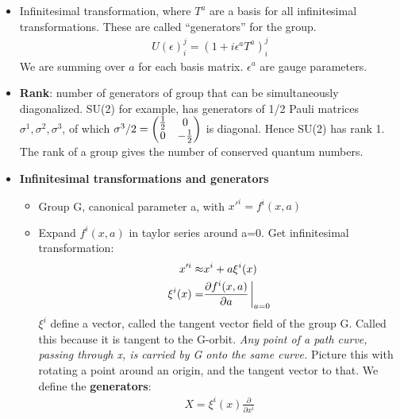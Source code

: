 \begin{itemize}
        \item Infinitesimal transformation, where $T^a$ are a basis for all infinitesimal transformations. These are called ``generators'' for the group. \cite{wells}
        \begin{equation}\begin{split}
        U(\epsilon)_i^j=(1+i\epsilon^aT^a)_i^j
        \end{split}\end{equation}
        We are summing over $a$ for each basis matrix. $\epsilon^a$ are gauge parameters.
    \item \textbf{Rank}: number of generators of group that can be simultaneously diagonalized. SU(2) for example, has generators of 1/2 Pauli matrices $\sigma^1,\sigma^2,\sigma^3$, of which $\sigma^3/2=\begin{pmatrix}\frac{1}{2}&0\\0&-\frac{1}{2}\end{pmatrix}$ is diagonal. Hence SU(2) has rank 1. The rank of a group gives the number of conserved quantum numbers.
    \item \textbf{Infinitesimal transformations and generators} \cite{ibragimov}
    \begin{itemize}
        \item Group G, canonical parameter a, with $x'^i=f^i(x,a)$ \cite{ibragimov}
        \item Expand $f^i(x,a)$ in taylor series around a=0. Get infinitesimal transformation: \cite{ibragimov}
        \begin{equation}\begin{split}
        x'^i\approx&x^i+a\xi^i(x) \\
        \xi^i(x)=&\frac{\partial f^i(x,a)}{\partial a}\eval_{a=0} \\
        \end{split}\end{equation}
        $\xi^i$ define a vector, called the tangent vector field of the group G. Called this because it is tangent to the G-orbit. \emph{Any point of a path curve, passing through x, is carried by G onto the same curve.} Picture this with rotating a point around an origin, and the tangent vector to that.
        We define the \textbf{generators}:
        \begin{equation}\begin{split}
        X=\xi^i(x)\frac{\partial}{\partial x^i}
        \end{split}\end{equation}
    \end{itemize}

\end{itemize}
